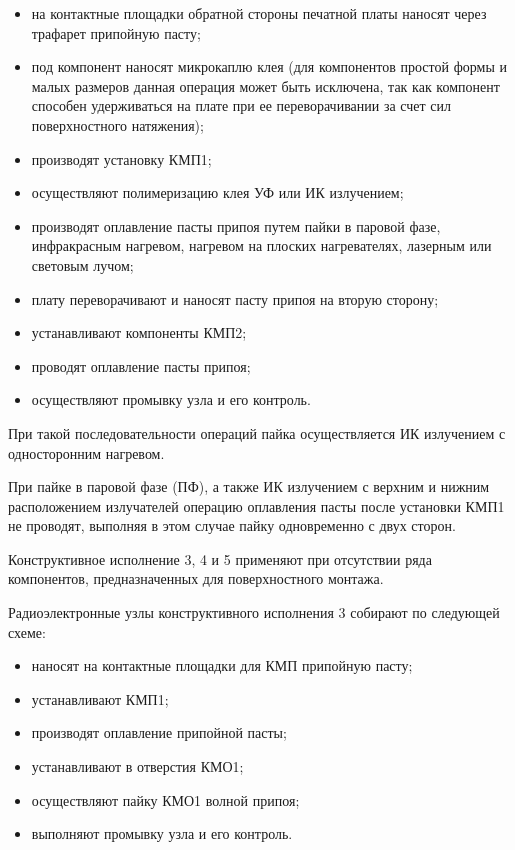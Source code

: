 \documentclass[unicode, 12pt, a4paper, oneside]{article}
\begin{document}
\begin{itemize}
\item на контактные площадки обратной стороны печатной платы наносят через трафарет припойную пасту;
\item под компонент наносят микрокаплю клея (для компонентов простой формы и малых размеров данная операция может быть исключена, так как компонент способен удерживаться на плате при ее переворачивании за счет сил поверхностного натяжения);
\item производят установку  КМП1; 
\item осуществляют полимеризацию клея УФ или ИК излучением;
\item производят оплавление пасты припоя путем пайки в паровой фазе, инфракрасным нагревом,  нагревом на плоских нагревателях, лазерным или световым лучом;
\item плату переворачивают и наносят пасту припоя на вторую сторону;
\item устанавливают компоненты КМП2;
\item проводят оплавление пасты припоя;
\item осуществляют промывку узла и его контроль.
\end{itemize}

При такой последовательности операций пайка осуществляется ИК излучением с односторонним нагревом.

При пайке в паровой фазе (ПФ), а также ИК излучением с верхним и нижним расположением излучателей операцию оплавления пасты после установки КМП1 не проводят, выполняя в этом случае пайку одновременно с двух сторон.

Конструктивное исполнение 3, 4 и 5 применяют при отсутствии ряда компонентов, предназначенных для поверхностного монтажа.

Радиоэлектронные узлы конструктивного исполнения  3 собирают по следующей схеме:

\begin{itemize}
\item наносят на контактные площадки для КМП припойную пасту;
\item устанавливают КМП1;
\item производят оплавление припойной пасты;
\item устанавливают в отверстия КМО1;
\item осуществляют пайку КМО1 волной припоя;
\item выполняют промывку узла и его контроль.
\end{itemize}
\end{document}
